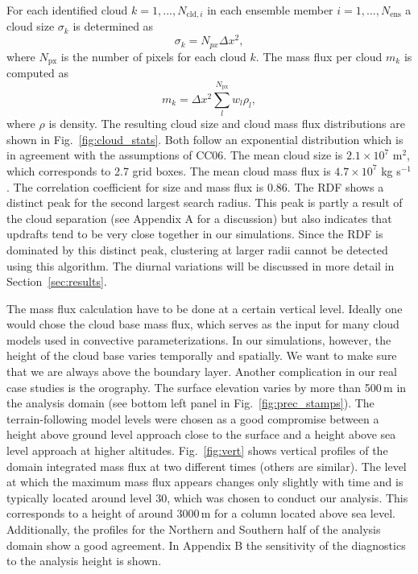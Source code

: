 \documentclass[a4paper, 12pt]{article}
\begin{document}
For each identified cloud $k=1,...,N_{\mathrm{cld},i}$ in each ensemble member $i=1,...,N_{\mathrm{ens}}$ a cloud size $\sigma_k$ is determined as
\begin{equation} \label{eq:cld_size}
 \sigma_k = N_{px} \Delta x^2,
\end{equation}
where $N_{\mathrm{px}}$ is the number of pixels for each cloud $k$. The mass flux per cloud $m_k$ is computed as
\begin{equation} \label{eq:mass_flux_per_cloud}
 m_k = \Delta x^2 \sum_{l}^{N_{\mathrm{px}}} w_l \rho_l,
\end{equation}
where $\rho$ is density. The resulting cloud size and cloud mass flux distributions are shown in Fig.~\ref{fig:cloud_stats}. Both follow an exponential distribution which is in agreement with the assumptions of CC06. The mean cloud size is $2.1\times 10^7$ m$^2$, which corresponds to 2.7 grid boxes. The mean cloud mass flux is $4.7\times 10^7$ kg s$^{-1}$. The correlation coefficient for size and mass flux is 0.86. The RDF shows a distinct peak for the second largest search radius. This peak is partly a result of the cloud separation (see Appendix A for a discussion) but also indicates that updrafts tend to be very close together in our simulations. Since the RDF is dominated by this distinct peak, clustering at larger radii cannot be detected using this algorithm. The diurnal variations will be discussed in more detail in Section~\ref{sec:results}.

The mass flux calculation have to be done at a certain vertical level. Ideally one would chose the cloud base mass flux, which serves as the input for many cloud models used in convective parameterizations. In our simulations, however, the height of the cloud base varies temporally and spatially. We want to make sure that we are always above the boundary layer. Another complication in our real case studies is the orography. The surface elevation varies by more than 500\,m in the analysis domain (see bottom left panel in Fig.~\ref{fig:prec_stamps}). The terrain-following model levels were chosen as a good compromise between a height above ground level approach close to the surface and a height above sea level approach at higher altitudes. Fig.~\ref{fig:vert} shows vertical profiles of the domain integrated mass flux at two different times (others are similar). The level at which the maximum mass flux appears changes only slightly with time and is typically located around level 30, which was chosen to conduct our analysis. This corresponds to a height of around 3000\,m for a column located above sea level. Additionally, the profiles for the Northern and Southern half of the analysis domain show a good agreement. In Appendix B the sensitivity of the diagnostics to the analysis height is shown.
\end{document}
